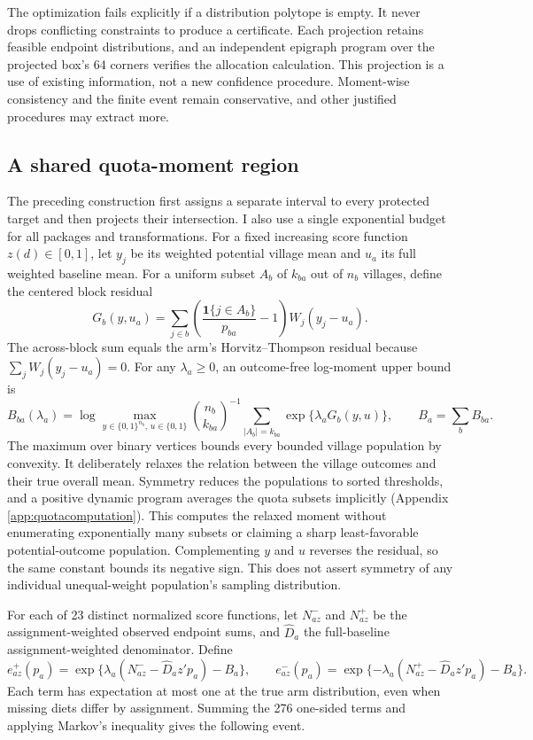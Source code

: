 \documentclass[11pt]{article}
\newcommand{\ind}{\mathbf{1}}
\begin{document}
The optimization fails explicitly if a distribution polytope is empty. It never drops conflicting constraints to produce a certificate. Each projection retains feasible endpoint distributions, and an independent epigraph program over the projected box's 64 corners verifies the allocation calculation. This projection is a use of existing information, not a new confidence procedure. Moment-wise consistency and the finite event remain conservative, and other justified procedures may extract more.

\subsection{A shared quota-moment region}

The preceding construction first assigns a separate interval to every protected target and then projects their intersection. I also use a single exponential budget for all packages and transformations. For a fixed increasing score function $z(d)\in[0,1]$, let $y_j$ be its weighted potential village mean and $u_a$ its full weighted baseline mean. For a uniform subset $A_b$ of $k_{ba}$ out of $n_b$ villages, define the centered block residual
\[
 G_b(y,u_a)=\sum_{j\in b}\left(\frac{\ind\{j\in A_b\}}{p_{ba}}-1\right)W_j(y_j-u_a).
\]
The across-block sum equals the arm's Horvitz--Thompson residual because $\sum_jW_j(y_j-u_a)=0$. For any $\lambda_a\geq0$, an outcome-free log-moment upper bound is
\begin{equation}
 B_{ba}(\lambda_a)=\log\max_{y\in\{0,1\}^{n_b},\,u\in\{0,1\}}
 \binom{n_b}{k_{ba}}^{-1}\sum_{|A_b|=k_{ba}}\exp\{\lambda_aG_b(y,u)\},\qquad B_a=\sum_bB_{ba}.\label{eq:quotamoment}
\end{equation}
The maximum over binary vertices bounds every bounded village population by convexity. It deliberately relaxes the relation between the village outcomes and their true overall mean. Symmetry reduces the populations to sorted thresholds, and a positive dynamic program averages the quota subsets implicitly (Appendix \ref{app:quotacomputation}). This computes the relaxed moment without enumerating exponentially many subsets or claiming a sharp least-favorable potential-outcome population. Complementing $y$ and $u$ reverses the residual, so the same constant bounds its negative sign. This does not assert symmetry of any individual unequal-weight population's sampling distribution.

For each of 23 distinct normalized score functions, let $N_{az}^-$ and $N_{az}^+$ be the assignment-weighted observed endpoint sums, and $\widehat D_a$ the full-baseline assignment-weighted denominator. Define
\begin{equation}
 e_{az}^+(p_a)=\exp\{\lambda_a(N_{az}^--\widehat D_a z'p_a)-B_a\},\qquad
 e_{az}^-(p_a)=\exp\{-\lambda_a(N_{az}^+-\widehat D_a z'p_a)-B_a\}.\label{eq:quotatests}
\end{equation}
Each term has expectation at most one at the true arm distribution, even when missing diets differ by assignment. Summing the 276 one-sided terms and applying Markov's inequality gives the following event.
\end{document}
